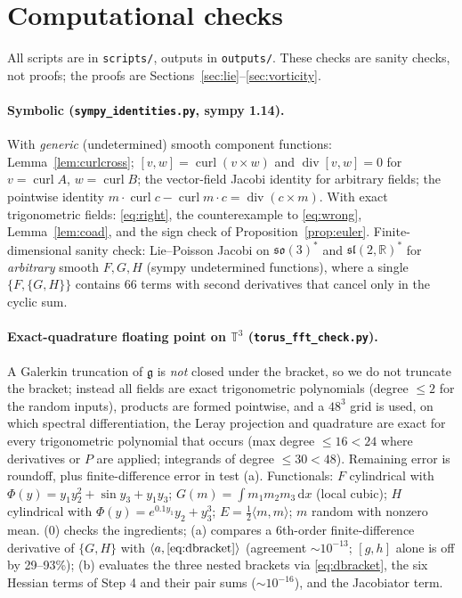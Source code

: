 \documentclass[11pt]{article}
\theoremstyle{definition}
\newcommand{\T}{\mathbb{T}^3}
\newcommand{\R}{\mathbb{R}}
\newcommand{\g}{\mathfrak{g}}
\newcommand{\ip}[2]{\langle #1,#2\rangle}
\newcommand{\dd}{\,\mathrm{d}x}
\newcommand{\curl}{\operatorname{curl}}
\renewcommand{\div}{\operatorname{div}}
\begin{document}
\section{Computational checks}\label{sec:checks}
All scripts are in \texttt{scripts/}, outputs in \texttt{outputs/}. These checks are sanity checks,
not proofs; the proofs are Sections~\ref{sec:lie}--\ref{sec:vorticity}.

\paragraph{Symbolic (\texttt{sympy\_identities.py}, sympy 1.14).} With \emph{generic} (undetermined) smooth
component functions: Lemma~\ref{lem:curlcross}; $[v,w]=\curl(v\times w)$ and $\div[v,w]=0$ for
$v=\curl A$, $w=\curl B$; the vector-field Jacobi identity for arbitrary fields; the pointwise identity
$m\cdot\curl c-\curl m\cdot c=\div(c\times m)$. With exact trigonometric fields: \eqref{eq:right}, the
counterexample to \eqref{eq:wrong}, Lemma~\ref{lem:coad}, and the sign check of
Proposition~\ref{prop:euler}. Finite-dimensional sanity check: Lie--Poisson Jacobi on $\mathfrak{so}(3)^*$ and
$\mathfrak{sl}(2,\R)^*$ for \emph{arbitrary} smooth $F,G,H$ (sympy undetermined functions), where a single
$\{F,\{G,H\}\}$ contains 66 terms with second derivatives that cancel only in the cyclic sum.


\paragraph{Exact-quadrature floating point on $\T$ (\texttt{torus\_fft\_check.py}).}
A Galerkin truncation of $\g$ is \emph{not} closed under the bracket, so we do not truncate the bracket;
instead all fields are exact trigonometric polynomials (degree $\le2$ for the random inputs), products are
formed pointwise, and a $48^3$ grid is used, on which spectral differentiation, the Leray projection and
quadrature are exact for every trigonometric polynomial that occurs (max degree $\le16<24$ where derivatives
or $P$ are applied; integrands of degree $\le30<48$). Remaining error is roundoff, plus finite-difference
error in test (a). Functionals: $F$ cylindrical with $\Phi(y)=y_1y_2^2+\sin y_3+y_1y_3$; $G(m)=\int m_1m_2m_3\dd$ (local cubic);
$H$ cylindrical with $\Phi(y)=e^{0.1y_1}y_2+y_3^3$; $E=\frac12\ip mm$; $m$ random with nonzero mean.
(0) checks the ingredients; (a) compares a 6th-order finite-difference derivative of $\{G,H\}$ with
$\ip a{\eqref{eq:dbracket}}$ (agreement $\sim10^{-13}$; $[g,h]$ alone is off by 29--93\%); (b) evaluates the
three nested brackets via \eqref{eq:dbracket}, the six Hessian terms of Step 4 and their pair sums
($\sim10^{-16}$), and the Jacobiator term.

\end{document}
